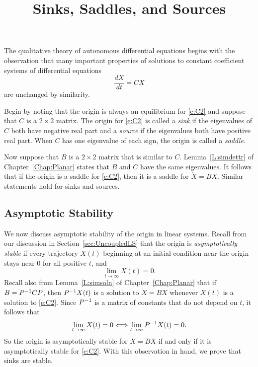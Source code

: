\documentclass{ximera}
\title{Sinks, Saddles, and Sources}
\begin{document}
\begin{abstract}
\end{abstract}
\maketitle

 \label{S:6.7}

The qualitative theory of autonomous differential equations begins with
the observation that many important properties of solutions to constant
coefficient systems of differential equations
\begin{equation} \label{e:C2}
\frac{dX}{dt}=CX
\end{equation}
are unchanged by similarity.

Begin by noting that the origin is always an equilibrium for \eqref{e:C2}
and suppose that $C$ is a $2\times 2$ matrix.  The origin for \eqref{e:C2}
is called a {\em sink\/} if the eigenvalues of $C$ both have
negative real
part and a {\em source\/} if the eigenvalues both have
positive real part.
When $C$ has one eigenvalue of each sign, the origin is called a
{\em saddle}.

Now suppose that $B$ is a $2\times 2$ matrix that is similar to $C$.
Lemma~\ref{L:simdettr} of Chapter~\ref{Chap:Planar} states that $B$ and
$C$ have the same eigenvalues.  It follows that if the origin is a saddle
for \eqref{e:C2}, then it is a saddle for $\dot{X}=BX$.  Similar statements
hold for sinks and sources.

\subsection*{Asymptotic Stability}

We now discuss asymptotic stability of the origin in linear systems.
Recall from our discussion in Section~\ref{sec:UncoupledLS} 
that the origin is {\em asymptotically stable\/} 
if every trajectory $X(t)$ beginning at an initial condition near the
origin stays near $0$ for all positive $t$, and
\[
\lim_{t\to\infty}X(t) = 0.
\]
Recall also from Lemma~\ref{L:simsoln} of Chapter~\ref{Chap:Planar} that
if $B=P^{-1} CP$, then $P^{-1} X(t)$ is a solution to $\dot{X}=BX$ whenever
$X(t)$ is a solution to \eqref{e:C2}.  Since $P^{-1}$ is a matrix of constants
that do not depend on $t$, it follows that
\[
\lim_{t\to\infty}X(t) = 0 \Longleftrightarrow \lim_{t\to\infty}P^{-1} X(t) = 0.
\]
So the origin is asymptotically stable for $\dot{X}=BX$ if and only if it is
asymptotically stable for \eqref{e:C2}.  With this observation in hand, we
prove that sinks are stable.
\end{document}
